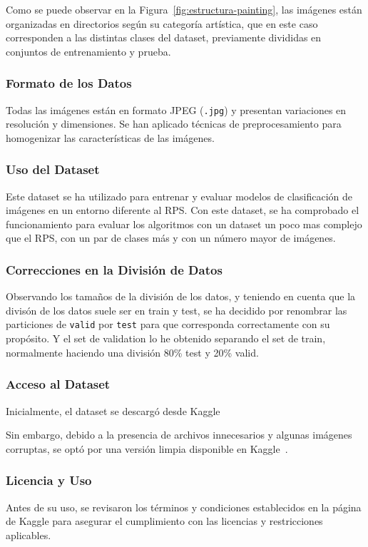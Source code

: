 Como se puede observar en la Figura~\ref{fig:estructura-painting}, las imágenes están organizadas en directorios según su categoría artística,
que en este caso corresponden a las distintas clases del dataset, previamente divididas en conjuntos de entrenamiento y prueba.

\subsubsection{Formato de los Datos}
Todas las imágenes están en formato JPEG (\texttt{.jpg}) y presentan variaciones en resolución y dimensiones.
Se han aplicado técnicas de preprocesamiento para homogenizar las características de las imágenes.

\subsubsection{Uso del Dataset}
Este dataset se ha utilizado para entrenar y evaluar modelos de clasificación de imágenes en un entorno diferente al
RPS\@.
Con este dataset, se ha comprobado el funcionamiento para evaluar los algoritmos con un dataset un poco mas complejo
que el RPS, con un par de clases más y con un número mayor de imágenes.

\subsubsection{Correcciones en la División de Datos}
Observando los tamaños de la división de los datos, y teniendo en cuenta que la divisón de los datos suele ser en train
y test, se ha decidido por renombrar las particiones de \texttt{valid} por \texttt{test} para que corresponda
correctamente con su propósito.
Y el set de validation lo he obtenido separando el set de train, normalmente haciendo una división 80\% test y 20\%
valid.

\subsubsection{Acceso al Dataset}
Inicialmente, el dataset se descargó desde Kaggle~\cite{OriginalArtImages}

Sin embargo, debido a la presencia de archivos innecesarios y algunas imágenes corruptas, se optó por una versión
limpia disponible en Kaggle~\cite{CleanedArtImages}.

\subsubsection{Licencia y Uso}
Antes de su uso, se revisaron los términos y condiciones establecidos en la página de Kaggle para asegurar el
cumplimiento con las licencias y restricciones aplicables.

